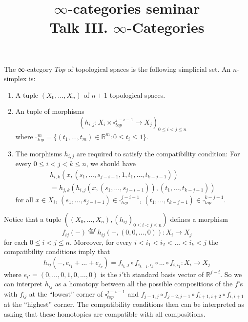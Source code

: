 \documentclass[a4paper]{amsart}
\title{$∞$-categories seminar \\
Talk III. $∞$-Categories}
\numberwithin{figure}{section}
\theoremstyle{theorem}
\theoremstyle{definition}
\newcommand{\RR}{\mathbb{R}}
\DeclareMathOperator{\id}{id}
\begin{document}
The ∞-category $Top$ of topological spaces is the following simplicial set. An $n$-simplex is:
\begin{enumerate}
 \item A tuple $(X_0, \dots, X_n)$ of $n{+}1$ topological spaces.

 \item An tuple of morphisms  
 \[ (h_{i,j}: X_i {\times} \square^{j{-}i{-}1}_{top} \to X_{j})_{0 \leq i < j \leq n} \]%
 where $\square^m_{top} = \{ (t_1, \dots, t_m) \in \RR^m : 0 \leq t_i \leq 1 \}$.

 \item The morphisms $h_{i,j}$ are required to satisfy the compatibility condition: For every $0 \leq i < j < k \leq n$, we should have 
\begin{align*}
h_{i,k}(x, (s_1, \dots, s_{j{-}i{-}1}, 1, t_1, \dots, t_{k{-}j{-}1})) \\
= h_{j,k}(h_{i,j}(x, (s_1, \dots, s_{j{-}i{-}1})), (t_1, \dots, t_{k{-}j{-}1})) 
\end{align*}
for all $x \in X_i$, $(s_1, \dots, s_{j{-}i{-}1}) \in \square_{top}^{j{-}i{-}1}$, $(t_1, \dots, t_{k{-}j{-}1}) \in \square_{top}^{k{-}j{-}1}$.
\end{enumerate}

Notice that a tuple $((X_0, \dots, X_n), (h_{ij})_{0 \leq i < j \leq n})$ defines a morphism $$f_{ij}(-) \stackrel{def}{=} h_{ij}(-, (0,0,\dots, 0)) : X_i \to X_j$$ for each $0 \leq i < j \leq n$. Moreover, for every $i < i_1 < i_2 < \dots  < i_k < j$ the compatibility conditions imply that $$h_{ij}(-, e_{i_1} + \dots + e_{j_k}) = f_{i_k,j} \circ f_{i_{k-1},i_k} \circ \dots \circ f_{i, i_1}: X_i \to X_j$$ where $e_{i'} = (0, \dots, 0, 1, 0, \dots, 0)$ is the $i'$th standard basis vector of $\RR^{j{-}i}$. So we can interpret $h_{ij}$ as a homotopy between all the possible compositions of the $f$'s with $f_{ij}$ at the ``lowest'' corner of $\square^{j{-}i{-}1}_{top}$ and $f_{j{-}1,j} \circ f_{j{-}2,j{-}1} \circ f_{i{+}1,i{+}2} \circ f_{i,i{+}1}$ at the ``highest'' corner. The compatibility conditions then can be interpreted as asking that these homotopies are compatible with all compositions.
\end{document}
